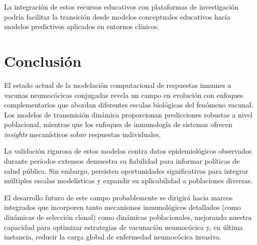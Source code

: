 La integración de estos recursos educativos con plataformas de investigación podría facilitar la transición desde modelos conceptuales educativos hacia modelos predictivos aplicados en entornos clínicos.

\section{Conclusión}

El estado actual de la modelación computacional de respuestas inmunes a vacunas neumocócicas conjugadas revela un campo en evolución con enfoques complementarios que abordan diferentes escalas biológicas del fenómeno vacunal. Los modelos de transmisión dinámica proporcionan predicciones robustas a nivel poblacional, mientras que los enfoques de inmunología de sistemas ofrecen \textit{insights} mecanísticos sobre respuestas individuales.

La validación rigurosa de estos modelos contra datos epidemiológicos observados durante períodos extensos demuestra su fiabilidad para informar políticas de salud pública. Sin embargo, persisten oportunidades significativas para integrar múltiples escalas modelísticas y expandir su aplicabilidad a poblaciones diversas.

El desarrollo futuro de este campo probablemente se dirigirá hacia marcos integrados que incorporen tanto mecanismos inmunológicos detallados (como dinámicas de selección clonal) como dinámicas poblacionales, mejorando nuestra capacidad para optimizar estrategias de vacunación neumocócica y, en última instancia, reducir la carga global de enfermedad neumocócica invasiva.